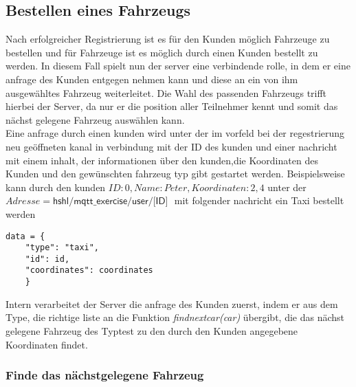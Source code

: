 \documentclass[conference]{IEEEtran}
\begin{document}
\subsection{Bestellen eines Fahrzeugs}
Nach erfolgreicher Registrierung ist es für den Kunden möglich Fahrzeuge zu bestellen und für Fahrzeuge ist es möglich durch einen Kunden bestellt zu werden. In diesem Fall spielt nun der server eine verbindende rolle, in dem er eine anfrage des Kunden entgegen nehmen kann und diese an ein von ihm ausgewähltes Fahrzeug weiterleitet. Die Wahl des passenden Fahrzeugs trifft hierbei der Server, da nur er die position aller Teilnehmer kennt und somit das nächst gelegene Fahrzeug auswählen kann.\\ 
Eine anfrage durch einen kunden wird unter der im vorfeld bei der regestrierung neu geöffneten kanal in verbindung mit der ID des kunden und einer nachricht mit einem inhalt, der informationen über den kunden,die Koordinaten des Kunden und den gewünschten fahrzeug typ gibt gestartet werden. Beispielsweise kann durch den kunden $ID: 0, Name: Peter, Koordinaten: 2,4$ unter der $Adresse=\textsf{hshl/mqtt\_exercise/user/[ID] }$ mit folgender nachricht ein Taxi bestellt werden \begin{lstlisting}
data = {
	"type": "taxi",
    "id": id,
    "coordinates": coordinates
    }
\end{lstlisting}
Intern verarbeitet der Server die anfrage des Kunden zuerst, indem er aus dem Type, die richtige liste an die Funktion \textit{findnextcar(car)} übergibt, die das nächst gelegene Fahrzeug des Typtest zu den durch den Kunden angegebene Koordinaten findet.
\subsubsection{Finde das nächstgelegene Fahrzeug}

\begin{thebibliography}{00}
\end{thebibliography}
\vspace{12pt}
\end{document}
